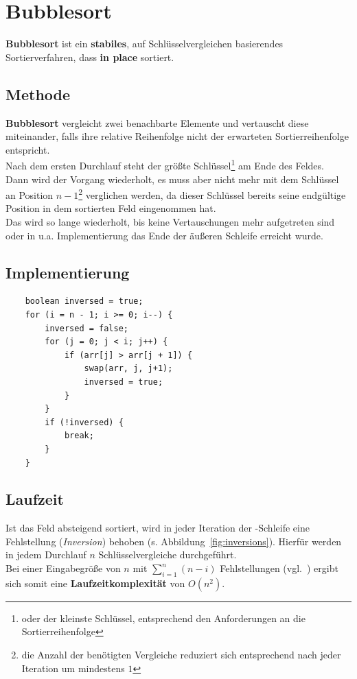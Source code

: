 \section{Bubblesort}

\textbf{Bubblesort} ist ein \textbf{stabiles}, auf Schlüsselvergleichen basierendes Sortierverfahren, dass \textbf{in place} sortiert.

\subsection{Methode}
\textbf{Bubblesort} vergleicht zwei benachbarte Elemente und vertauscht diese miteinander, falls ihre relative Reihenfolge nicht der erwarteten Sortierreihenfolge entspricht.\\
Nach dem ersten Durchlauf steht der größte  Schlüssel\footnote{oder der kleinste Schlüssel, entsprechend den Anforderungen an die Sortierreihenfolge} am Ende des Feldes.\\
Dann wird der Vorgang wiederholt, es muss aber nicht mehr mit dem Schlüssel an Position $n-1$\footnote{die Anzahl der benötigten Vergleiche reduziert sich entsprechend nach jeder Iteration um mindestens $1$} verglichen werden, da dieser Schlüssel bereits seine endgültige Position in dem sortierten Feld eingenommen hat.\\
Das wird so lange wiederholt, bis keine Vertauschungen mehr aufgetreten sind oder in u.a. Implementierung das Ende der äußeren Schleife erreicht wurde.\\

\subsection{Implementierung}

\begin{verbatim}
    boolean inversed = true;
    for (i = n - 1; i >= 0; i--) {
        inversed = false;
        for (j = 0; j < i; j++) {
            if (arr[j] > arr[j + 1]) {
                swap(arr, j, j+1);
                inversed = true;
            }
        }
        if (!inversed) {
            break;
        }
    }
\end{verbatim}

\subsection{Laufzeit}
Ist das Feld absteigend sortiert, wird in jeder Iteration der -Schleife eine Fehlstellung (\textit{Inversion}) behoben (s. Abbildung~\ref{fig:inversions}).
Hierfür werden in jedem Durchlauf $n$ Schlüsselvergleiche durchgeführt.\\
Bei einer Eingabegröße von $n$ mit $\sum_{i=1}^n (n-i)$  Fehlstellungen (vgl.~\cite[87]{OW17b}) ergibt sich somit eine \textbf{Laufzeitkomplexität} von $O(n^2)$.


